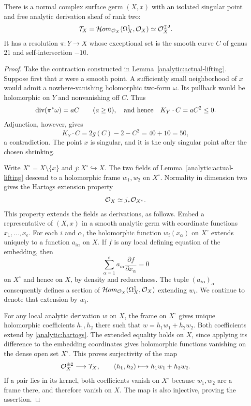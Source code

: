 \begin{proposition}\label{prop:analytic-counterexample}
There is a normal complex surface germ $(X,x)$ with an isolated
singular point and free analytic derivation sheaf of rank two:
\[
 \mathcal T_X=\mathcal{H}om_{\mathcal O_X}(\Omega_X^1,\mathcal O_X)
 \simeq\mathcal O_X^{\oplus2}.
\]
It has a resolution $\pi:Y\to X$ whose exceptional set is the
smooth curve $C$ of genus $21$ and self-intersection $-10$.
\end{proposition}

\begin{proof}
Take the contraction constructed in
Lemma~\ref{analytic:actual-lifting}.  Suppose first that $x$ were a
smooth point.  A sufficiently small neighborhood of $x$ would admit
a nowhere-vanishing holomorphic two-form $\omega$.  Its pullback
would be holomorphic on $Y$ and nonvanishing off $C$.  Thus
\[
 \operatorname{div}(\pi^*\omega)=aC\qquad(a\geq0),
 \quad\hbox{and hence}\quad K_Y\cdot C=aC^2\leq0.
\]
Adjunction, however, gives
\[
 K_Y\cdot C=2g(C)-2-C^2=40+10=50,
\]
a contradiction.  The point $x$ is singular, and it is the only
singular point after the chosen shrinking.

Write $X^\circ=X\setminus\{x\}$ and
$j:X^\circ\hookrightarrow X$.  The two fields of
Lemma~\ref{analytic:actual-lifting} descend to a holomorphic frame
$w_1,w_2$ on $X^\circ$.  Normality in dimension two gives the
Hartogs extension property~\cite[Chapter~II, Corollary~7.8]{Demailly2012}
\begin{equation}\label{analytic:hartogs}
 \mathcal O_X\simeq j_*\mathcal O_{X^\circ}.
\end{equation}
This property extends the fields as derivations, as follows.  Embed
a representative of $(X,x)$ in a smooth analytic germ with
coordinate functions $x_1,\ldots,x_e$.  For each $i$ and $\alpha$,
the holomorphic function $w_i(x_\alpha)$ on $X^\circ$ extends
uniquely to a function $a_{i\alpha}$ on $X$.  If $f$ is any local
defining equation of the embedding, then
\[
 \sum_{\alpha=1}^e
 a_{i\alpha}\frac{\partial f}{\partial x_\alpha}=0
\]
on $X^\circ$ and hence on $X$, by density and reducedness.  The
tuple $(a_{i\alpha})_\alpha$ consequently defines a section of
$\mathcal{H}om_{\mathcal O_X}(\Omega_X^1,\mathcal O_X)$ extending $w_i$.  We
continue to denote that extension by $w_i$.

For any local analytic derivation $w$ on $X$, the frame on
$X^\circ$ gives unique holomorphic coefficients $h_1,h_2$ there
such that $w=h_1w_1+h_2w_2$.  Both coefficients extend by
\eqref{analytic:hartogs}.  The extended equality holds on $X$,
since applying its difference to the embedding coordinates gives
holomorphic functions vanishing on the dense open set $X^\circ$.
This proves surjectivity of the map
\[
 \mathcal O_X^{\oplus2}\longrightarrow\mathcal T_X,
 \qquad(h_1,h_2)\longmapsto h_1w_1+h_2w_2.
\]
If a pair lies in its kernel, both coefficients vanish on
$X^\circ$ because $w_1,w_2$ are a frame there, and therefore vanish
on $X$.  The map is also injective, proving the assertion.
\end{proof}

